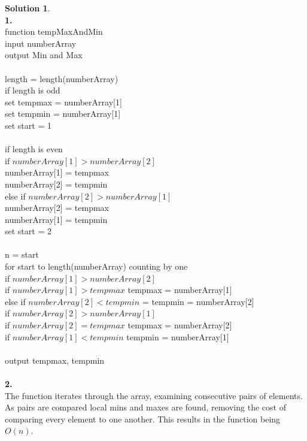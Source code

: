 \documentclass{article}
\theoremstyle{definition}
\newtheorem*{solution}{Solution}
\begin{document}
\begin{solution}
\ \\
\textbf{1.} \ \\
function tempMaxAndMin\ \\
input numberArray\ \\
output Min and Max\ \\
\ \\
length = length(numberArray)\ \\
if length is odd\ \\
set tempmax = numberArray[1]\ \\
set tempmin = numberArray[1]\ \\
set start = 1\ \\
\ \\
if length is even\ \\
 if $numberArray[1] > numberArray[2]$\ \\
 numberArray[1] = tempmax\ \\
 numberArray[2] = tempmin \ \\
 else if $numberArray[2] > numberArray[1]$\ \\
 numberArray[2] = tempmax\ \\
 numberArray[1] = tempmin \ \\
 set start = 2\ \\
 \ \\
 n = start\ \\
 for start to length(numberArray) counting by one \ \\
 if $numberArray[1] > numberArray[2]$\ \\
 if $numberArray[1] > tempmax$ tempmax = numberArray[1]\ \\
 else if $ numberArray[2] < tempmin$ = tempmin = numberArray[2]  \ \\
 if $numberArray[2] > numberArray[1]$\ \\
 if $numberArray[2] = tempmax$ tempmax = numberArray[2] \ \\
 if $numberArray[1] < tempmin$ tempmin = numberArray[1]\ \\
 \ \\
 output tempmax, tempmin\ \\
 \ \\
 \textbf{2.} \ \\
 The function iterates through the array, examining consecutive pairs of elements. As pairs are compared local mins and maxes are found, removing the cost of comparing every element to one another. This results in the function being $O(n)$.


\end{solution}
\end{document}
